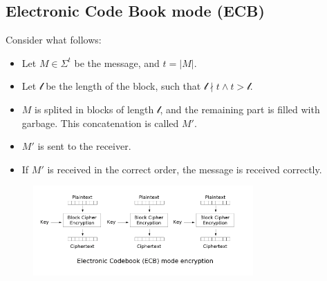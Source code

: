 \subsection{Electronic Code Book mode (ECB)}
Consider what follows:
\begin{itemize}
    \item Let $M \in \Sigma^{t}$ be the message, and $t = |M|$.
    \item Let $\mathcal{l}$ be the length of the block, such that $\mathcal{l} \nmid t \land t > \mathcal{l}$.
    \item $M$ is splited in blocks of length $\mathcal{l}$, and the remaining part is filled with garbage. This concatenation is called $M'$.
    \item $M'$ is sent to the receiver.
    \item If $M'$ is received in the correct order, the  message is received correctly.
\end{itemize}

\begin{figure}[h]
    \centering
    \includegraphics[width=0.75\textwidth]{img/ECB.png}
\end{figure}

